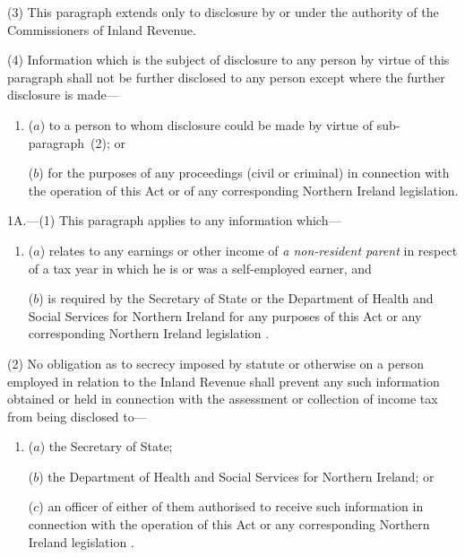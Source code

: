 \documentclass[12pt,a4paper]{article}
\begin{document}
(3) This paragraph extends only to disclosure by or under the authority of the Commissioners of Inland Revenue.

(4) Information which is the subject of disclosure to any person by virtue of this paragraph shall not be further disclosed to any person except where the further disclosure is made—
\begin{enumerate}\item[]
($a$) to a person to whom disclosure could be made by virtue of sub-\hspace{0pt}paragraph~(2); or

($b$) for the purposes of any proceedings (civil or criminal) in connection with the operation of this Act or of any corresponding Northern Ireland legislation.
\end{enumerate}


\medskip

1A.---(1) This paragraph applies to any information which—
\begin{enumerate}\item[]
($a$) relates to any earnings or other income of 
\emph{a non-resident parent}  %
in respect of a tax year in which he is or was a self-employed earner, and

($b$) is required by the Secretary of State or the Department of Health and Social Services for Northern Ireland for any purposes of this Act
or any corresponding Northern Ireland legislation%
.
\end{enumerate}

(2) No obligation as to secrecy imposed by statute or otherwise on a person employed in relation to the Inland Revenue shall prevent any such information obtained or held in connection with the assessment or collection of income tax from being disclosed to—
\begin{enumerate}\item[]
($a$) the Secretary of State;

($b$) the Department of Health and Social Services for Northern Ireland; or

($c$) an officer of either of them authorised to receive such information in connection with the operation of this Act
or any corresponding Northern Ireland legislation%
.
\end{enumerate}
\end{document}
